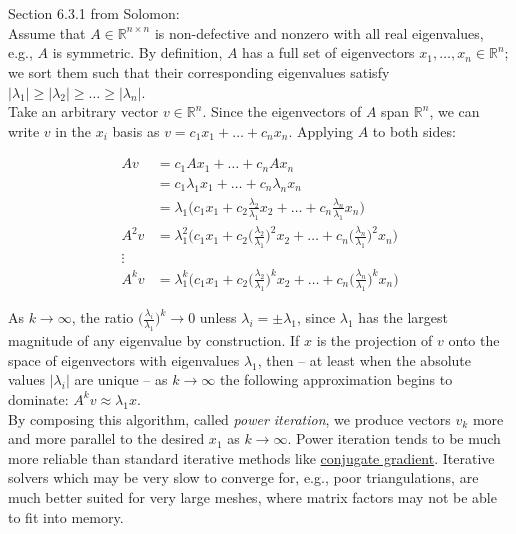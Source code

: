 \documentclass{article}
\newcommand\ifrac[2]{{\displaystyle\frac{#1}{#2}}}
\def\R{\mathbb{R}}
\def\R{\mathbb{R}}
\begin{document}
\vspace{1.8cm}
\\\\

Section 6.3.1 from Solomon:\\

Assume that $A \in \R^{n \times n}$ is non-defective and nonzero with all real eigenvalues,
e.g., $A$ is symmetric. By definition, $A$ has a full set of eigenvectors $x_1,\dots,x_n \in \R^n$; 
we sort them such that their corresponding eigenvalues satisfy $|\lambda_1| \ge |\lambda_2| \ge \dots \ge |\lambda_n|$.\\

Take an arbitrary vector $v \in \R^n$. Since the eigenvectors of $A$ span $\R^n$, we can write
$v$ in the $x_i$ basis as $v = c_1x_1 + \dots + c_nx_n$. Applying $A$ to both sides:

\begin{align*}
    Av &= c_1Ax_1 + \dots + c_nAx_n \\
        &= c_1\lambda_1x_1 + \dots + c_n\lambda_nx_n \tag*{since $Ax_i = \lambda x_i$} \\
        &= \lambda_1 \Big( c_1x_1 + c_2\frac{\lambda_2}{\lambda_1}x_2 + \dots + c_n\frac{\lambda_n}{\lambda_1}x_n \Big) \\
    A^2v &= \lambda_1^2 \Big(c_1x_1 + c_2\Big(\frac{\lambda_2}{\lambda_1}\Big)^2x_2 + \dots + c_n\Big(\frac{\lambda_n}{\lambda_1}\Big)^2x_n \Big) \\
    \vdots \\
    A^kv &= \lambda_1^k \Big(c_1x_1 + c_2\Big(\frac{\lambda_2}{\lambda_1}\Big)^kx_2 + \dots + c_n\Big(\frac{\lambda_n}{\lambda_1}\Big)^kx_n \Big)
\end{align*}

As $k \rightarrow \infty$, the ratio $\Big(\ifrac{\lambda_i}{\lambda_1}\Big)^k \rightarrow 0$ unless $\lambda_i = \pm \lambda_1$,
since $\lambda_1$ has the largest magnitude of any eigenvalue by construction. If $x$ is the projection of $v$ onto the space
of eigenvectors with eigenvalues $\lambda_1$, then -- at least when the absolute values $|\lambda_i|$ are unique --
as $k \rightarrow \infty$ the following approximation begins to dominate: $A^kv \approx \lambda_1x$.\\

By composing this algorithm, called \emph{power iteration}, we produce vectors $v_k$ more and more parallel
to the desired $x_1$ as $k \rightarrow \infty$. Power iteration tends to be much more reliable than standard iterative
methods like \href{https://www.cs.cmu.edu/~quake-papers/painless-conjugate-gradient.pdf}{conjugate gradient}.
Iterative solvers which may be very slow to converge for, e.g., poor triangulations,
are much better suited for very large meshes, where matrix factors may not be able to fit into memory. 
\end{document}
